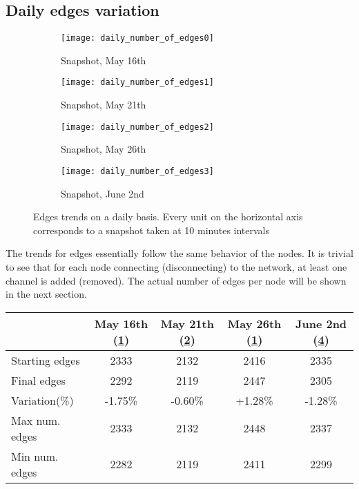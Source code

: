 	\subsection{Daily edges variation}

	\begin{figure}[h]
		\centering
		\begin{subfigure}{0.45\textwidth}
			\centering
			\texttt{[image: daily\_number\_of\_edges0]}
			\caption{Snapshot, May 16th}
			\label{daily_edges0}
		\end{subfigure}
		\begin{subfigure}{0.45\textwidth}
			\centering
			\texttt{[image: daily\_number\_of\_edges1]}
			\caption{Snapshot, May 21th}
			\label{daily_edges1}
		\end{subfigure}
		\begin{subfigure}{0.45\textwidth}
			\centering
			\texttt{[image: daily\_number\_of\_edges2]}
			\caption{Snapshot, May 26th}
			\label{daily_edges2}
		\end{subfigure}
		\begin{subfigure}{0.45\textwidth}
			\centering
			\texttt{[image: daily\_number\_of\_edges3]}
			\caption{Snapshot, June 2nd}
			\label{daily_edges3}
		\end{subfigure}
		
		\caption{Edges trends on a daily basis. Every unit on the horizontal axis corresponds to a snapshot taken at 10 minutes intervals}
		\label{daily_edges_variation}
	\end{figure}

	The trends for edges essentially follow the same behavior of the nodes. It is trivial to see that for each node connecting (disconnecting) to the network, at least one channel is added (removed). The actual number of edges per node will be shown in the next section.
	
	\begin{center}
	\begin{tabulary}{\linewidth}{| L | C | C | C | C |}
		\hline
		& May 16th (\ref{daily_edges0}) & May 21th (\ref{daily_edges1}) & May 26th (\ref{daily_edges0}) & June 2nd (\ref{daily_edges3}) \\
		\hline
		Starting edges & 2333 & 2132 & 2416 & 2335 \\ \hline
		Final edges & 2292 & 2119 & 2447 & 2305 \\ \hline
		Variation(\%) & -1.75\% & -0.60\% & +1.28\% & -1.28\% \\ \hline
		Max num. edges & 2333 & 2132 & 2448 & 2337 \\ \hline
		Min num. edges & 2282 & 2119 & 2411 & 2299 \\ \hline	
	\end{tabulary}
	\end{center}

